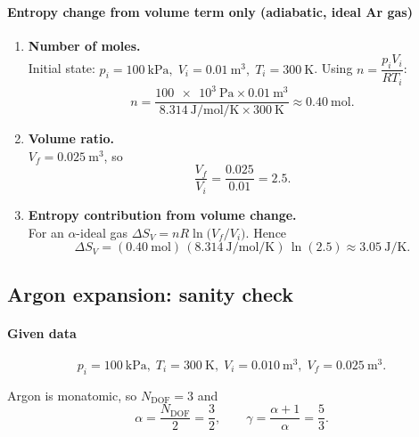 \documentclass[12pt]{article}
\theoremstyle{definition} %
\theoremstyle{plain} %
\begin{document}
\paragraph{Entropy change from volume term only (adiabatic, ideal Ar gas)}

\begin{enumerate}
  \item \textbf{Number of moles.}\\
        Initial state: 
        \(p_i = \SI{100}{\kilo\pascal},\;
          V_i = \SI{0.01}{\meter^{3}},\;
          T_i = \SI{300}{\kelvin}\).
        Using \(n = \dfrac{p_i V_i}{RT_i}\):
        \[
          n 
          = \frac{\SI{100e3}{\pascal}\times \SI{0.01}{\meter^{3}}}
                 {\SI{8.314}{\joule\per\mole\per\kelvin}\times \SI{300}{\kelvin}}
          \approx \SI{0.40}{\mole}.
        \]

  \item \textbf{Volume ratio.}\\
        \(V_f = \SI{0.025}{\meter^{3}}\), so
        \[
          \frac{V_f}{V_i} = \frac{0.025}{0.01} = 2.5.
        \]

  \item \textbf{Entropy contribution from volume change.}\\
        For an \(\alpha\)-ideal gas
        \(\displaystyle
          \Delta S_V = nR\ln\!\bigl(V_f/V_i\bigr).
        \)
        Hence
        \[
          \Delta S_V
          = (\SI{0.40}{\mole})
            \,(\SI{8.314}{\joule\per\mole\per\kelvin})
            \,\ln(2.5)
          \approx \boxed{\SI{3.05}{\joule\per\kelvin}}.
        \]
\end{enumerate}
\subsection*{Argon expansion: sanity check}

\paragraph{Given data}
\[
  p_i = \SI{100}{\kilo\pascal},\;
  T_i = \SI{300}{\kelvin},\;
  V_i = \SI{0.010}{\metre^{3}},\;
  V_f = \SI{0.025}{\metre^{3}}.
\]

Argon is monatomic, so \(N_{\text{DOF}} = 3\) and
\[
  \alpha = \frac{N_{\text{DOF}}}{2} = \frac{3}{2}, 
  \qquad
  \gamma = \frac{\alpha+1}{\alpha} = \frac{5}{3}.
\]

\end{document}
